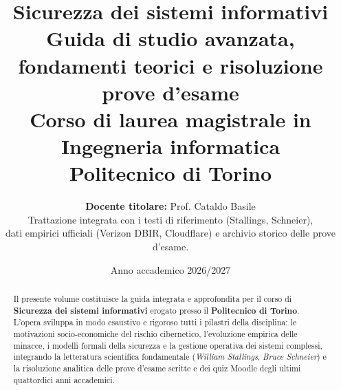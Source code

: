 \documentclass[11pt,a4paper,oneside]{report}
\title{
    \vspace{-1.5cm}
    \textbf{\Huge Sicurezza dei sistemi informativi} \\[0.4cm]
    \Large Guida di studio avanzata, fondamenti teorici e risoluzione prove d'esame \\[0.8cm]
    \large Corso di laurea magistrale in Ingegneria informatica \\
    \large Politecnico di Torino
}
\author{
    \textbf{Docente titolare:} Prof. Cataldo Basile \\[0.2cm]
    \small Trattazione integrata con i testi di riferimento (Stallings, Schneier),\\
    \small dati empirici ufficiali (Verizon DBIR, Cloudflare) e archivio storico delle prove d'esame.
}
\date{Anno accademico 2026/2027}
\begin{document}
\maketitle

\begin{abstract}
\noindent Il presente volume costituisce la guida integrata e approfondita per il corso di \textbf{Sicurezza dei sistemi informativi} erogato presso il \textbf{Politecnico di Torino}. L'opera sviluppa in modo esaustivo e rigoroso tutti i pilastri della disciplina: le motivazioni socio-economiche del rischio cibernetico, l'evoluzione empirica delle minacce, i modelli formali della sicurezza e la gestione operativa dei sistemi complessi, integrando la letteratura scientifica fondamentale (\textit{William Stallings}, \textit{Bruce Schneier}) e la risoluzione analitica delle prove d'esame scritte e dei quiz Moodle degli ultimi quattordici anni accademici.
\end{abstract}

\tableofcontents
\newpage



\end{document}
